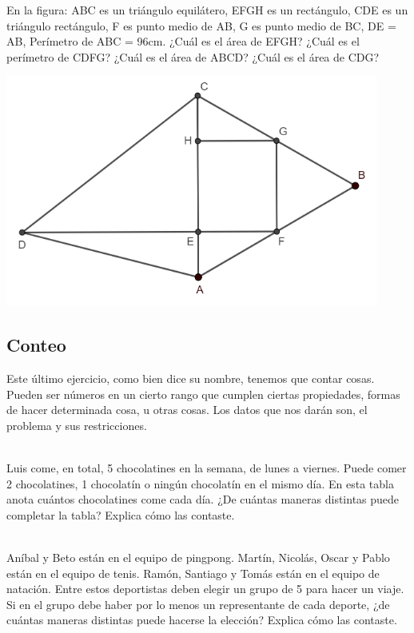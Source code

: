 \documentclass{article}
\begin{document}
\begin{ejemplo}
En la figura:
ABC es un triángulo equilátero,
EFGH es un rectángulo,
CDE es un triángulo rectángulo,
F es punto medio de AB,
G es punto medio de BC,
DE = AB,
Perímetro de ABC = 96cm.
¿Cuál es el área de EFGH?
¿Cuál es el perímetro de CDFG?
¿Cuál es el área de ABCD?
¿Cuál es el área de CDG?

\includegraphics[scale=0.6]{geometry-example-2}
\end{ejemplo}

\subsection{Conteo}
\begin{normalsize}
Este último ejercicio, como bien dice su nombre, tenemos que contar cosas. Pueden ser números en un cierto rango que cumplen ciertas propiedades, formas de hacer determinada cosa, u otras cosas. Los datos que nos darán son, el problema y sus restricciones.
\\
\\
\end{normalsize}

\begin{ejemplo}
Luis come, en total, 5 chocolatines en la semana, de lunes a viernes.
Puede comer 2 chocolatines, 1 chocolatín o ningún chocolatín en el mismo día.
En esta tabla anota cuántos chocolatines come cada día.
¿De cuántas maneras distintas puede completar la tabla?
Explica cómo las contaste.
\\
\\
\end{ejemplo}

\begin{ejemplo}
Aníbal y Beto están en el equipo de pingpong.
Martín, Nicolás, Oscar y Pablo están en el equipo de tenis.
Ramón, Santiago y Tomás están en el equipo de natación.
Entre estos deportistas deben elegir un grupo de 5 para hacer un viaje.
Si en el grupo debe haber por lo menos un representante de cada deporte,
¿de cuántas maneras distintas puede hacerse la elección?
Explica cómo las contaste.

\end{ejemplo}
\end{document}
